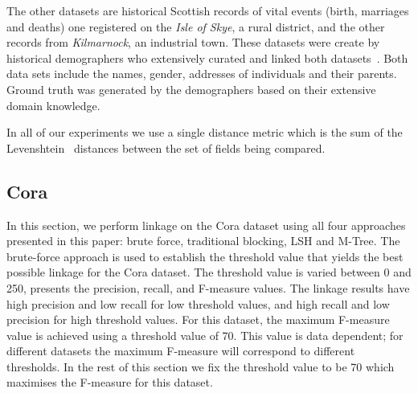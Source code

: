 \documentclass{llncs}
\begin{document}
The other datasets are historical Scottish records of vital events
(birth, marriages and deaths) one registered on the \emph{Isle of Skye},
a rural district, and the other records from \emph{Kilmarnock}, an
industrial town. These datasets were create by historical demographers
who extensively curated and linked both
datasets~\cite{reid2002,reid2006}. Both data sets include the names,
gender, addresses of individuals and their parents. Ground truth was
generated by the demographers based on their extensive domain knowledge.

In all of our experiments we use a single distance metric which is the
sum of the Levenshtein~\cite{Levenshtein66} distances between the set of
fields being compared.

\subsection{Cora}

In this section, we perform linkage on the Cora dataset using all four
approaches presented in this paper: brute force, traditional blocking,
LSH and M-Tree. The brute-force approach is used to establish the
threshold value that yields the best possible linkage for the Cora
dataset. The threshold value is varied between 0 and 250,
 presents the precision, recall, and F-measure
values. The linkage results have high precision and low recall for low
threshold values, and high recall and low precision for high threshold
values. For this dataset, the maximum F-measure value is achieved using
a threshold value of 70. This value is data dependent; for different
datasets the maximum F-measure will correspond to different thresholds.
In the rest of this section we fix the threshold value to be 70 which
maximises the F-measure for this dataset.
\end{document}
